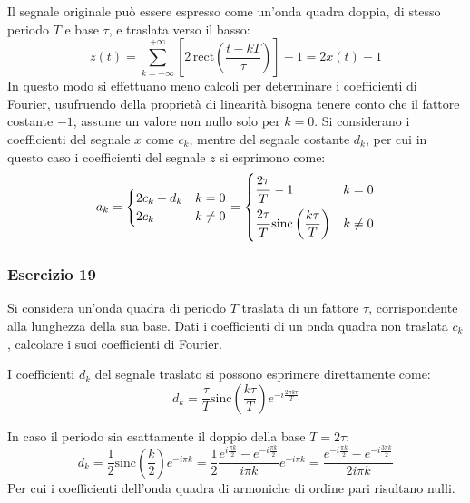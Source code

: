 \documentclass{article}
\newcommand{\rect}{\mathrm{rect}}
\newcommand{\sinc}{\mathrm{sinc}}
\begin{document}
Il segnale originale può essere espresso come un'onda quadra doppia, di stesso periodo $T$ e base $\tau$, e traslata verso il basso:
\begin{equation*}
    z(t)=\displaystyle\sum_{k=-\infty}^{+\infty}\left[2\,\rect\left(\frac{t-kT}{\tau}\right)\right]-1=2x(t)-1
\end{equation*}
In questo modo si effettuano meno calcoli per determinare i coefficienti di Fourier, usufruendo della proprietà di linearità bisogna tenere conto che il fattore costante $-1$, 
assume un valore non nullo solo per $k=0$. Si considerano i coefficienti del segnale $x$ come $c_k$, mentre del segnale costante $d_k$, per cui in questo caso i coefficienti 
del segnale $z$ si esprimono come: 
\begin{equation}
    a_k=\begin{cases}
        2c_k+d_k &k=0\\
        2c_k&k\neq0
    \end{cases}=\begin{cases}
        \displaystyle\frac{\strut 2\tau}{\strut T}-1&k=0\\
        \displaystyle\frac{\strut 2\tau}{\strut T}\sinc\left(\frac{ k\tau}{ T}\right)&k\neq0
    \end{cases}
\end{equation}

\subsubsection*{Esercizio 19}

Si considera un'onda quadra di periodo $T$ traslata di un fattore $\tau$, corrispondente alla lunghezza della sua base. Dati i coefficienti di un onda quadra non traslata 
$c_k$, calcolare i suoi coefficienti di Fourier. 

I coefficienti $d_k$ del segnale traslato si possono esprimere direttamente come:
\begin{equation}
    d_k=\displaystyle\frac{\tau}{T}\sinc\left(\frac{k\tau}{T}\right)e^{-i\frac{2\pi k\tau}{T}}
\end{equation}

In caso il periodo sia esattamente il doppio della base $T=2\tau$:
\begin{equation}
    d_k=\displaystyle\frac{1}{2}\sinc\left(\frac{k}{2}\right)e^{-i\pi k}=\frac{1}{2}\frac{e^{i\frac{\pi k}{2}}-e^{-i\frac{\pi k}{2}}}{i\pi k}e^{-i\pi k}=
    \frac{e^{-i\frac{\pi k}{2}}-e^{-i\frac{3\pi k}{2}}}{2i\pi k}
\end{equation}
Per cui i coefficienti dell'onda quadra di armoniche di ordine pari risultano nulli. 
\end{document}
